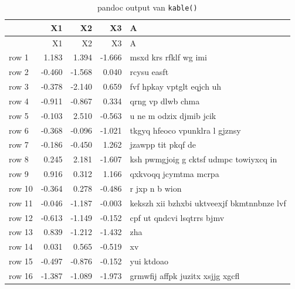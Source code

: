\documentclass[twoside]{extreport}
\begin{document}
\begin{Shaded}
\begin{Highlighting}[]
\NormalTok{(}
  \NormalTok{(}\NormalTok{, }\NormalTok{(}\NormalTok{, }\NormalTok{), }\NormalTok{, }\NormalTok{), }
   \NormalTok{,}
   \NormalTok{,}
   
\NormalTok{)}
\end{Highlighting}
\end{Shaded}

\begin{longtable}[]{@{}lrrrl@{}}
\caption{\label{tab:kable-pandoc}pandoc output van
\texttt{kable()}}\tabularnewline
\toprule
& X1 & X2 & X3 & A \\
\midrule
\endfirsthead
\toprule
& X1 & X2 & X3 & A \\
\midrule
\endhead
row 1 & 1.183 & 1.394 & -1.666 & msxd krs rfklf wg imi \\
row 2 & -0.460 & -1.568 & 0.040 & rcysu easft \\
row 3 & -0.378 & -2.140 & 0.659 & fvf hpkay vptglt eqjch uh \\
row 4 & -0.911 & -0.867 & 0.334 & qrng vp dlwb chma \\
row 5 & -0.103 & 2.510 & -0.563 & u ne m odzix djmib jcik \\
row 6 & -0.368 & -0.096 & -1.021 & tkgyq hfeoco vpunklra l gjznsy \\
row 7 & -0.186 & -0.450 & 1.262 & jzawpp tit pkqf de \\
row 8 & 0.245 & 2.181 & -1.607 & ksh pwmgjoig g cktsf udmpc towiyxcq
in \\
row 9 & 0.916 & 0.312 & 1.166 & qxkvoqq jcymtma mcrpa \\
row 10 & -0.364 & 0.278 & -0.486 & r jxp n b wion \\
row 11 & -0.046 & -1.187 & -0.003 & kekszh xii bzhxbi uktveexjf
bkmtnnbnze lvf \\
row 12 & -0.613 & -1.149 & -0.152 & cpf ut qndcvi lsqtrrs bjmv \\
row 13 & 0.839 & -1.212 & -1.432 & zha \\
row 14 & 0.031 & 0.565 & -0.519 & xv \\
row 15 & -0.497 & -0.876 & -0.152 & yui ktdoao \\
row 16 & -1.387 & -1.089 & -1.973 & grmwfij affpk juzitx xsjjg xgcfl \\

\end{longtable}
\end{document}
